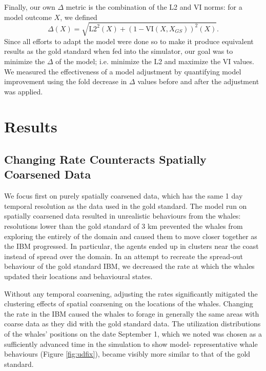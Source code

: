 \documentclass[11pt]{article}
\begin{document}
Finally, our own $\Delta$ metric is the combination of the L2 and VI norms: for a model outcome $X$, we defined
\begin{equation}\Delta(X) = \sqrt{\text{L2}^2(X) + (1-\text{VI}(X,X_{GS}))^2(X)}.\end{equation}
Since all efforts to adapt the model were done so to make it produce equivalent results as the gold standard when fed into the simulator, our goal was to minimize the $\Delta$ of the model; i.e. minimize the L2 and maximize the VI values. We measured the effectiveness of a model adjustment by quantifying model improvement using the fold decrease in $\Delta$ values before and after the adjustment was applied.\par

\section{Results}
\subsection{Changing Rate Counteracts Spatially Coarsened Data}
We focus first on purely spatially coarsened data, which has the same 1 day temporal resolution as the data used in the gold standard. The model run on spatially coarsened data resulted in unrealistic behaviours from the whales: resolutions lower than the gold standard of 3 km prevented the whales from exploring the entirely of the domain and caused them to move closer together as the IBM progressed. In particular, the agents ended up in clusters near the coast instead of spread over the domain. In an attempt to recreate the spread-out behaviour of the gold standard IBM, we decreased the rate at which the whales updated their locations and behavioural states. \par 

Without any temporal coarsening, adjusting the rates significantly mitigated the clustering effects of spatial coarsening on the locations of the whales. Changing the rate in the IBM caused the whales to forage in generally the same areas with coarse data as they did with the gold standard data. The utilization distributions of the whales’ positions on the date September 1, which we noted was chosen as a sufficiently advanced time in the simulation to show model- representative whale behaviours (Figure \ref{fig:udfix}), became visibly more similar to that of the gold standard. \par
\end{document}
